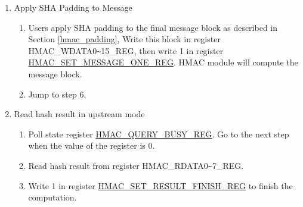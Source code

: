 \documentclass[main\_\_EN.tex]{subfiles}
\begin{document}
\begin{enumerate}
\begin{enumerate}
\begin{itemize}
\begin{enumerate}
                \item If Block\_\textcolor{red}{n} is the only message block, $n=1$, and Block\_\textcolor{red}{1} has included all padding bits, write 1 in register \hyperref[regdesc:HMACONEBLOCKREG]{HMAC\_ONE\_BLOCK\_REG}, and then jump to step 6.
                \item If Block\_\textcolor{red}{n} is the second last block of the padded message, write 1 in register\\ \hyperref[regdesc:HMACSETMESSAGEPADREG]{HMAC\_SET\_MESSAGE\_PAD\_REG}, and jump to step 5.
                \item If Block\_\textcolor{red}{n} is neither the last nor the second last message block, write 1 in register \\\hyperref[regdesc:HMACSETMESSAGEINGREG]{HMAC\_SET\_MESSAGE\_ING\_REG} and make $n=n+1$, then jump to step 4.(b).
            \end{enumerate}
        \end{itemize}
    \end{enumerate}

    \item Apply SHA Padding to Message
    \begin{enumerate}
        \item Users apply SHA padding to the final message block as described in Section \ref{hmac_padding}, Write this block in register HMAC\_WDATA0\verb+~+15\_REG, then write 1 in register \hyperref[regdesc:HMACSETMESSAGEONEREG]{HMAC\_SET\_MESSAGE\_ONE\_REG}. HMAC module will compute the message block.
        \item Jump to step 6.
    \end{enumerate}

    \item Read hash result in upstream mode
    \begin{enumerate}
        \item Poll state register \hyperref[regdesc:HMACQUERYBUSYREG]{HMAC\_QUERY\_BUSY\_REG}. Go to the next step when the value of the register is 0.
        \item Read hash result from register HMAC\_RDATA0\verb+~+7\_REG.
        \item Write 1 in register \hyperref[regdesc:HMACSETRESULTFINISHREG]{HMAC\_SET\_RESULT\_FINISH\_REG} to finish the computation.
    \end{enumerate}

\end{enumerate}
\end{document}
